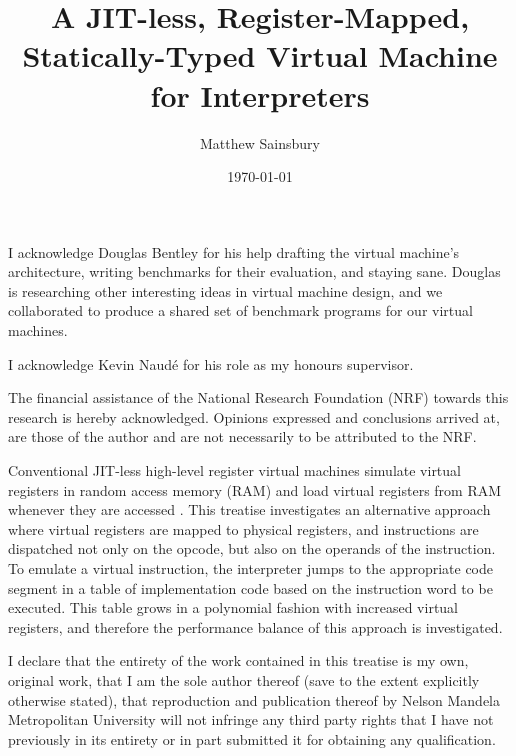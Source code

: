 



\title{A JIT-less, Register-Mapped, Statically-Typed Virtual Machine for Interpreters}
\author{Matthew Sainsbury}
\date{\today}

\begin{titlepage}

		\maketitle
	
\end{titlepage}


	I acknowledge Douglas Bentley for his help drafting the virtual machine's architecture, writing benchmarks for their evaluation, and staying sane. Douglas is researching other interesting ideas in virtual machine design, and we collaborated to produce a shared set of benchmark programs for our virtual machines.
	
	I acknowledge Kevin Naudé for his role as my honours supervisor.
	
	The financial assistance of the National Research Foundation (NRF) towards this research is hereby acknowledged. Opinions expressed and conclusions arrived at, are those of the author and are not necessarily to be attributed to the NRF.

	Conventional JIT-less high-level register virtual machines simulate virtual registers in random access memory (RAM) and load virtual registers from RAM whenever they are accessed \citep{caseregistervm}. This treatise investigates an alternative approach where virtual registers are mapped to physical registers, and instructions are dispatched not only on the opcode, but also on the operands of the instruction. To emulate a virtual instruction, the interpreter jumps to the appropriate code segment in a table of implementation code based on the instruction word to be executed. This table grows in a polynomial fashion with increased virtual registers, and therefore the performance balance of this approach is investigated.

	I declare that the entirety of the work contained in this treatise is my own, original work, that I am the sole author thereof (save to the extent explicitly otherwise stated), that reproduction	and publication thereof by Nelson Mandela Metropolitan University will not infringe any third	party rights that I have not previously in its entirety or in part submitted it for obtaining any qualification.
	
